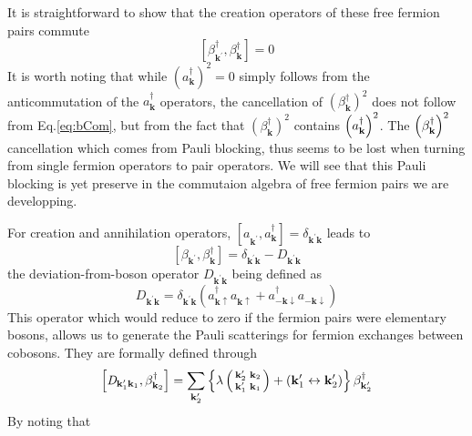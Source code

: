 \documentclass[aps,prb,superscriptaddress,twocolumn]{revtex4}
\newcommand{\vk}{\ensuremath{\mathbf{k}}}
\begin{document}
It is straightforward to show that the creation operators of these free fermion pairs commute 
\begin{equation}  \label{eq:bCom}
\left[\beta^{\dagger}_{\mathbf{k} ^{\prime}},\beta^{\dagger}_{\mathbf{k} }%
\right]  =0
\end{equation}
It is worth noting that while $\left(a^{\dagger}_{\mathbf{k} }\right) ^2=0$
simply follows from the anticommutation of the $a^{\dagger}_{\mathbf{k} }$
operators, the cancellation of $\left(\beta^{\dagger}_{\mathbf{k} }\right) ^2
$ does not follow from Eq.\eqref{eq:bCom}, but from the fact that $%
\left(\beta^{\dagger}_{\mathbf{k} }\right) ^2$ contains $\left(a^{\dagger}_{%
\mathbf{k} {}}\right) ^2$. The $\left(\beta^{\dagger}_{%
\mathbf{k} }\right) ^2$ cancellation which comes from Pauli blocking, thus seems to be lost
when turning from single fermion operators to pair operators. We will see that this Pauli blocking is yet preserve in the commutaion algebra of
free fermion pairs we are developping.

For creation and annihilation operators, $\left[a^{}_{\mathbf{k}
^{\prime}},a^{\dagger}_{\mathbf{k} {}}\right]  =\delta_{\mathbf{k} ^{\prime}%
\mathbf{k} }$ leads to 
\begin{equation}  \label{eq:betacom}
\left[\beta_{\mathbf{k} ^{\prime}},\beta^{\dagger}_{\mathbf{k} }\right] 
=\delta_{\mathbf{k} ^{\prime}\mathbf{k} }-\mathit{D} _{\mathbf{k} ^{\prime}%
\mathbf{k} }
\end{equation}
the deviation-from-boson operator $\mathit{D} _{\mathbf{k} ^{\prime}\mathbf{k%
} }$ being defined as 
\begin{equation}  \label{eq:D}
\mathit{D} _{\mathbf{k} ^{\prime}\mathbf{k} }=\delta_{\mathbf{k} ^{\prime}%
\mathbf{k} }\left(a^{\dagger}_{\mathbf{k} \uparrow}a^{}_{\mathbf{k}
\uparrow}+a^{\dagger}_{-\mathbf{k} \downarrow}a^{}_{-\mathbf{k}
\downarrow}\right) 
\end{equation}
This operator which would reduce to zero if the fermion pairs were
elementary bosons, allows us to generate the Pauli scatterings for fermion
exchanges between cobosons. They are formally defined through 
\begin{equation}
\left[\mathit{D} _{\mathbf{k} ^{\prime}_1\mathbf{k} _1},\beta^{\dagger}_{%
\mathbf{k} _2}\right]  =\sum_{\mathbf{k} ^{\prime}_2}\left\{\lambda\left(%
\begin{smallmatrix}\vk'_2&\vk_2\\\vk'_1&\vk_1\end{smallmatrix}\right) 
+\left(\mathbf{k} ^{\prime}_1\leftrightarrow\mathbf{k} ^{\prime}_2\right)
\right\} \beta^{\dagger}_{\mathbf{k} ^{\prime}_2}
\end{equation}
By noting that
\end{document}
